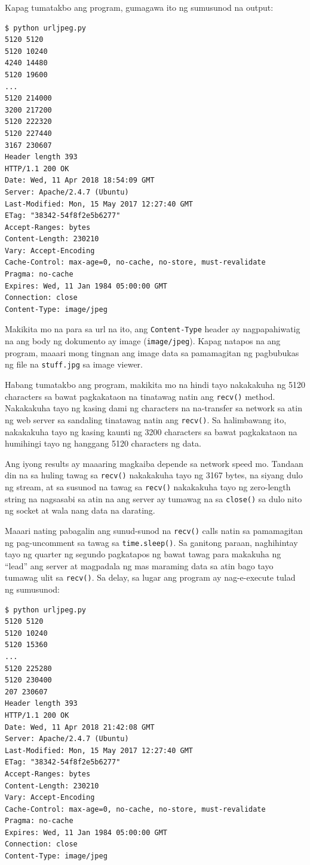 \documentclass[10pt,]{book}
\begin{document}
Kapag tumatakbo ang program, gumagawa ito ng sumusunod na output:

{\small
\begin{verbatim}
$ python urljpeg.py
5120 5120
5120 10240
4240 14480
5120 19600
...
5120 214000
3200 217200
5120 222320
5120 227440
3167 230607
Header length 393
HTTP/1.1 200 OK
Date: Wed, 11 Apr 2018 18:54:09 GMT
Server: Apache/2.4.7 (Ubuntu)
Last-Modified: Mon, 15 May 2017 12:27:40 GMT
ETag: "38342-54f8f2e5b6277"
Accept-Ranges: bytes
Content-Length: 230210
Vary: Accept-Encoding
Cache-Control: max-age=0, no-cache, no-store, must-revalidate
Pragma: no-cache
Expires: Wed, 11 Jan 1984 05:00:00 GMT
Connection: close
Content-Type: image/jpeg
\end{verbatim}
}

Makikita mo na para sa url na ito, ang \texttt{Content-Type} header ay
nagpapahiwatig na ang body ng dokumento ay image (\texttt{image/jpeg}).
Kapag natapos na ang program, maaari mong tingnan ang image data sa
pamamagitan ng pagbubukas ng file na \texttt{stuff.jpg} sa image viewer.

Habang tumatakbo ang program, makikita mo na hindi tayo nakakakuha ng
5120 characters sa bawat pagkakataon na tinatawag natin ang
\texttt{recv()} method. Nakakakuha tayo ng kasing dami ng characters na
na-transfer sa network sa atin ng web server sa sandaling tinatawag
natin ang \texttt{recv()}. Sa halimbawang ito, nakakakuha tayo ng kasing
kaunti ng 3200 characters sa bawat pagkakataon na humihingi tayo ng
hanggang 5120 characters ng data.

Ang iyong results ay maaaring magkaiba depende sa network speed mo.
Tandaan din na sa huling tawag sa \texttt{recv()} nakakakuha tayo ng
3167 bytes, na siyang dulo ng stream, at sa susunod na tawag sa
\texttt{recv()} nakakakuha tayo ng zero-length string na nagsasabi sa
atin na ang server ay tumawag na sa \texttt{close()} sa dulo nito ng
socket at wala nang data na darating.

 

Maaari nating pabagalin ang sunud-sunod na \texttt{recv()} calls natin
sa pamamagitan ng pag-uncomment sa tawag sa \texttt{time.sleep()}. Sa
ganitong paraan, naghihintay tayo ng quarter ng segundo pagkatapos ng
bawat tawag para makakuha ng ``lead'' ang server at magpadala ng mas
maraming data sa atin bago tayo tumawag ulit sa \texttt{recv()}. Sa
delay, sa lugar ang program ay nag-e-execute tulad ng sumusunod:

{\small
\begin{verbatim}
$ python urljpeg.py
5120 5120
5120 10240
5120 15360
...
5120 225280
5120 230400
207 230607
Header length 393
HTTP/1.1 200 OK
Date: Wed, 11 Apr 2018 21:42:08 GMT
Server: Apache/2.4.7 (Ubuntu)
Last-Modified: Mon, 15 May 2017 12:27:40 GMT
ETag: "38342-54f8f2e5b6277"
Accept-Ranges: bytes
Content-Length: 230210
Vary: Accept-Encoding
Cache-Control: max-age=0, no-cache, no-store, must-revalidate
Pragma: no-cache
Expires: Wed, 11 Jan 1984 05:00:00 GMT
Connection: close
Content-Type: image/jpeg
\end{verbatim}
}
\end{document}
